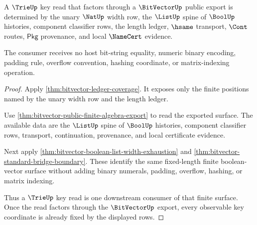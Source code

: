 \begin{theorem}
\label{thm:bitvector-mature-trie-key-consumer-example}
A $\TrieUp$ key read that factors through a $\BitVectorUp$ public export is
determined by the unary $\NatUp$ width row, the $\ListUp$ spine of $\BoolUp$
histories, component classifier rows, the length ledger, $\hsame$ transport,
$\Cont$ routes, $\mathsf{Pkg}$ provenance, and local $\NameCert$ evidence.

The consumer receives no host bit-string equality, numeric binary encoding,
padding rule, overflow convention, hashing coordinate, or matrix-indexing
operation.
\end{theorem}
\begin{proof}
Apply \autoref{thm:bitvector-ledger-coverage}. It exposes only the finite
positions named by the unary width row and the length ledger.

Use \autoref{thm:bitvector-public-finite-algebra-export} to read the exported
surface. The available data are the $\ListUp$ spine of $\BoolUp$ histories,
component classifier rows, transport, continuation, provenance, and local
certificate evidence.

Next apply \autoref{thm:bitvector-boolean-list-width-exhaustion} and
\autoref{thm:bitvector-standard-bridge-boundary}. These identify the same
fixed-length finite boolean-vector surface without adding binary numerals,
padding, overflow, hashing, or matrix indexing.

Thus a $\TrieUp$ key read is one downstream consumer of that finite surface.
Once the read factors through the $\BitVectorUp$ export, every observable key
coordinate is already fixed by the displayed rows.
\end{proof}


